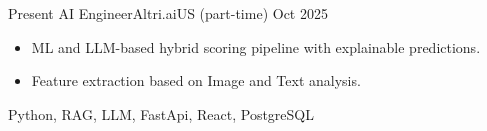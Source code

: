%
%
%




\begin{experiences}
  \experience
    {Present}   {AI Engineer}{Altri.ai}{US (part-time)}
    {Oct 2025} {
      \begin{itemize}
        \item ML and LLM-based hybrid scoring pipeline with explainable predictions.
        \item Feature extraction based on Image and Text analysis.
      \end{itemize}
    }
    {Python, RAG, LLM, FastApi, React, PostgreSQL}
  \emptySeparator
\end{experiences}

